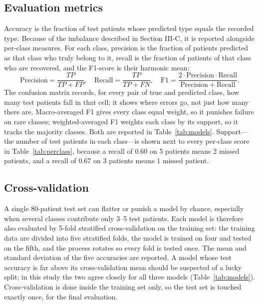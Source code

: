 \documentclass[conference]{IEEEtran}
\begin{document}
\subsection{Evaluation metrics}
Accuracy is the fraction of test patients whose predicted type equals the recorded type. Because of the imbalance described in Section III-C, it is reported alongside per-class measures. For each class, precision is the fraction of patients predicted as that class who truly belong to it, recall is the fraction of patients of that class who are recovered, and the F1-score is their harmonic mean:
\begin{equation}
\mathrm{Precision} = \frac{TP}{TP + FP}, \quad
\mathrm{Recall} = \frac{TP}{TP + FN}, \quad
\mathrm{F1} = \frac{2 \cdot \mathrm{Precision} \cdot \mathrm{Recall}}{\mathrm{Precision} + \mathrm{Recall}}.
\end{equation}
The confusion matrix records, for every pair of true and predicted class, how many test patients fall in that cell; it shows where errors go, not just how many there are. Macro-averaged F1 gives every class equal weight, so it punishes failure on rare classes; weighted-averaged F1 weights each class by its support, so it tracks the majority classes. Both are reported in Table~\ref{tab:models}. Support---the number of test patients in each class---is shown next to every per-class score in Table~\ref{tab:perclass}, because a recall of 0.60 on 5 patients means 2 missed patients, and a recall of 0.67 on 3 patients means 1 missed patient.

\subsection{Cross-validation}
A single 80-patient test set can flatter or punish a model by chance, especially when several classes contribute only 3--5 test patients. Each model is therefore also evaluated by 5-fold stratified cross-validation on the training set: the training data are divided into five stratified folds, the model is trained on four and tested on the fifth, and the process rotates so every fold is tested once. The mean and standard deviation of the five accuracies are reported. A model whose test accuracy is far above its cross-validation mean should be suspected of a lucky split; in this study the two agree closely for all three models (Table~\ref{tab:models}). Cross-validation is done inside the training set only, so the test set is touched exactly once, for the final evaluation.
\end{document}
